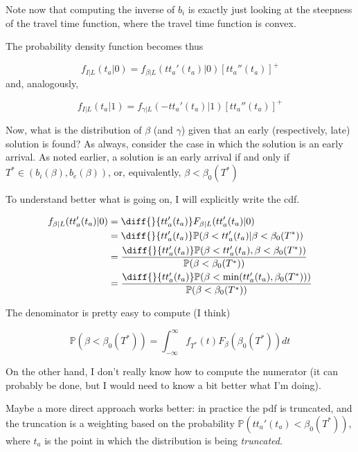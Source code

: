 \documentclass{article}
\begin{document}
Note now that computing the inverse of \(b_i\) is exactly just looking at the steepness of the travel time function, where the travel time function is convex.

The probability density function becomes thus

\begin{equation}
  \label{eq:pdf_early}
  f_{I | L}(t_a | 0) = f_{\beta | L}(tt_a'(t_a) | 0)[tt_a''(t_a)]^+
\end{equation}
and, analogously,

\begin{equation}
  \label{eq:pdf_late}
  f_{I | L}(t_a | 1) = f_{\gamma | L}(-tt_a'(t_a) | 1)[tt_a''(t_a)]^+
\end{equation}

Now, what is the distribution of \(\beta\) (and \(\gamma\)) given that an early (respectively, late) solution is found?
As always, consider the case in which the solution is an early arrival.
As noted earlier, a solution is an early arrival if and only if \(T^* \in (b_i(\beta), b_e(\beta))\), or, equivalently, \(\beta < \beta_0(T^*)\)

To understand better what is going on, I will explicitly write the cdf.

\begin{align*}
  f_{\beta | L}(tt_a'(t_a) | 0) & = \diff{}{tt_a'(t_a)}F_{\beta | L}(tt_a'(t_a) | 0) \\
  & = \diff{}{tt_a'(t_a)}\mathbb{P}(\beta < tt_a'(t_a) | \beta < \beta_0(T^*)) \\
  & = \frac{\diff{}{tt_a'(t_a)}\mathbb{P}(\beta < tt_a'(t_a), \beta < \beta_0(T^*))}{\mathbb{P}(\beta < \beta_0(T^*))} \\
  & = \frac{\diff{}{tt_a'(t_a)}\mathbb{P}(\beta < \min(tt_a'(t_a), \beta_0(T^*)))}{\mathbb{P}(\beta < \beta_0(T^*))}
\end{align*}

The denominator is pretty easy to compute (I think)

\begin{equation*}
  \mathbb{P}(\beta < \beta_0(T^*)) = \int_{-\infty}^\infty f_{T^*}(t) F_\beta(\beta_0(T^*)) dt
\end{equation*}

On the other hand, I don't really know how to compute the numerator (it can probably be done, but I would need to know a bit better what I'm doing).

Maybe a more direct approach works better:
in practice the pdf is truncated, and the truncation is a weighting based on the probability \(\mathbb{P}(tt_a'(t_a) < \beta_0(T^*))\), where \(t_a\) is the point in which the distribution is being \textit{truncated}.
\end{document}
